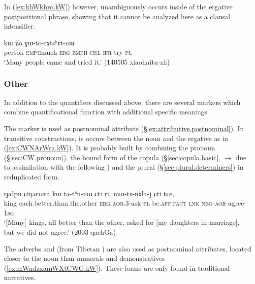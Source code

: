 In (\ref{ex:khWkhro.kW}) however,  unambiguously occurs inside of the ergative postpositional phrase, showing that it cannot be analyzed here as a clausal intensifier.


\begin{exe}
\ex \label{ex:khWkhro.kW}
 kɯ ʑo ɣɯ-to-rɤtsʰɤt-nɯ \\
person \textsc{emph}\redp{}much \textsc{erg} \textsc{emph} \textsc{cisl}-\textsc{ifr}-try-\textsc{pl} \\
\glt `Many people came and tried it.' (140505 xiaohaitu-zh)
\end{exe}

\subsubsection{Other} \label{sec:quantifiers.other}
In addition to the quantifiers discussed above, there are several markers which combine  quantificational function with additional specific meanings.

The marker  is used as postnominal attribute (§\ref{ex:attributive.postnominal}). In transitive constructions, is occurs between the noun and the ergative  as in  (\ref{ex:CWNArWra.kW}). It is probably built by combining the pronoun   (§\ref{sec:CW.pronoun}), the bound form of the copula   (§\ref{sec:copula.basic},  $\rightarrow$  due to assimilation with the following ) and the plural  (§\ref{sec:plural.determiners}) in reduplicated form.
 
  
\begin{exe}
\ex \label{ex:CWNArWra.kW}
\gll   rɟɤlpu ɕiŋarɯra kɯ ta-tʰu-nɯ ɕti ri, mɯ-tɤ-nɤla-j ɕti tɕe, \\
king each.better.than.the.other \textsc{erg} \textsc{aor}:3\flobv{}-ask-\textsc{pl} be.\textsc{aff}:\textsc{fact} \textsc{lnk} \textsc{neg}-\textsc{aor}-agree-\textsc{1sg} \\
\glt `[Many] kings, all better than the other, asked for [my daughters in marriage], but we did not agree.' (2003 qachGa)
\end{exe}

The adverbs  and  (from Tibetan  ) are also used as postnominal attributes, located closer to the noun than numerals and demonstratives (\ref{ex:mWndzxamWXtCWG.kW}). These forms are only found in traditional narratives.
 
